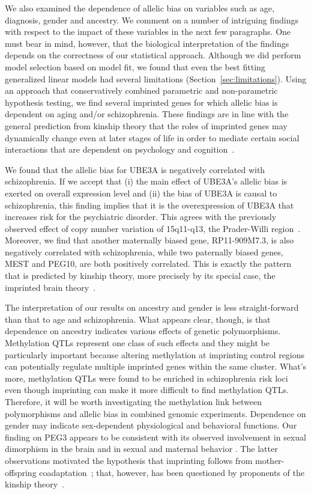 \documentclass[12pt,letterpaper]{article}
\begin{document}
We also examined the dependence of allelic bias on variables such as age,
diagnosis, gender and ancestry. We comment on a number of intriguing findings
with respect to the impact of these variables in the next few paragraphs.  One
must bear in mind, however, that the biological interpretation of the findings
depends on the correctness of our statistical approach.  Although we did
perform model selection based on model fit, we found that even the best
fitting generalized linear models had several limitations
(Section~\ref{sec:limitations}).  Using an approach that conservatively
combined parametric and non-parametric hypothesis testing, we find several
imprinted genes for which allelic bias is dependent on aging and/or
schizophrenia. These findings are in line with the general prediction from
kinship theory that the roles of imprinted genes may dynamically change even
at later stages of life in order to mediate certain social interactions that
are dependent on psychology and cognition~\cite{Ubeda2012,Wilkins2003}.

We found that the allelic bias for UBE3A is negatively correlated with
schizophrenia.  If we accept that (i) the main effect of UBE3A's allelic bias
is exerted on overall expression level and (ii) the bias of UBE3A is causal to
schizophrenia, this finding implies that it is the overexpression of UBE3A
that increases risk for the psychiatric disorder.  This agrees with the previously
observed effect of copy number variation of 15q11-q13, the Prader-Willi
region~\cite{McNamara2013}.  Moreover, we find that another maternally biased
gene, RP11-909M7.3, is also negatively correlated with schizophrenia, while
two paternally biased genes, MEST and PEG10, are both positively correlated.
This is exactly the pattern that is predicted by kinship theory, more
precisely by its special case, the imprinted brain theory~\cite{Crespi2008a}.

The interpretation of our results on ancestry and gender is less
straight-forward than that to age and schizophrenia.  What appears clear,
though, is that dependence on ancestry indicates various effects of genetic
polymorphisms.   Methylation QTLs represent one class of such effects and they
might be particularly important because altering methylation at imprinting
control regions can potentially regulate multiple imprinted genes within the
same cluster.  What's more, methylation QTLs were found to be enriched in
schizophrenia risk loci~\cite{Hannon2016} even though imprinting can make it
more difficult to find methylation QTLs.  Therefore, it will be worth
investigating the methylation link between polymorphisms and allelic bias in
combined genomic experiments.  Dependence on gender may indicate sex-dependent
physiological and behavioral functions.  Our finding on PEG3 appears to be
consistent with its observed involvement in sexual dimorphism in the brain and
in sexual and maternal behavior \cite{Broad2009}.  The latter observations
motivated the hypothesis that imprinting follows from mother-offspring
coadaptation~\cite{Keverne2015}; that, however, has been questioned by
proponents of the kinship theory~\cite{Haig2014}.
\end{document}
